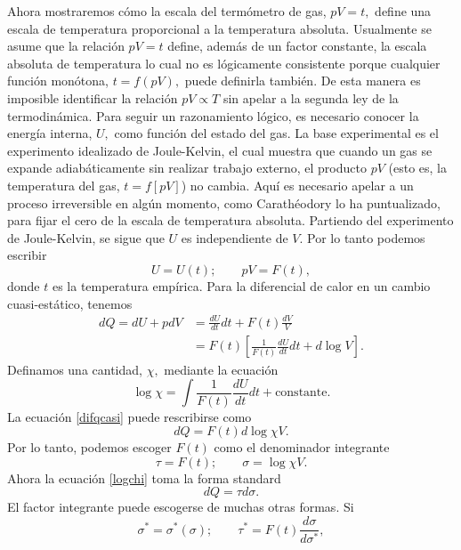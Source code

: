 \documentclass{article}
\theoremstyle{definition} \newtheorem{defi}{Definici\'on}
\theoremstyle{definition} \newtheorem{teo}{Teorema}
\theoremstyle{definition} \newtheorem{cor}{Corolario}
\begin{document}
Ahora mostraremos c\'omo la escala del term\'ometro de gas, $pV=t,$ define una escala de temperatura proporcional a la temperatura absoluta. Usualmente se asume que la relaci\'on $pV=t$ define, adem\'as de un factor constante, la escala absoluta de temperatura lo cual no es l\'ogicamente consistente porque cualquier funci\'on mon\'otona, $t=f(pV),$ puede definirla tambi\'en. De esta manera es imposible identificar la relaci\'on $pV\propto T$ sin apelar a la segunda ley de la termodin\'amica. Para seguir un razonamiento l\'ogico, es necesario conocer la energ\'ia interna, $U,$ como funci\'on del estado del gas. La base experimental es el experimento idealizado de Joule-Kelvin, el cual muestra que cuando un gas se expande adiab\'aticamente sin realizar trabajo externo, el producto $pV$ (esto es, la temperatura del gas, $t=f[pV]$) no cambia. Aqu\'i es necesario apelar a un proceso irreversible en alg\'un momento, como Carath\'eodory lo ha puntualizado, para fijar el cero de la escala de temperatura absoluta. Partiendo del experimento de Joule-Kelvin, se sigue que $U$ es independiente de $V.$ Por lo tanto podemos escribir
\begin{equation}
U=U(t);\qquad pV=F(t),
\end{equation}
donde $t$ es la temperatura emp\'irica. Para la diferencial de calor en un cambio cuasi-est\'atico, tenemos
\begin{align}\label{difqcasi}
dQ=dU+pdV&=\frac{dU}{dt}dt+F(t)\frac{dV}{V}\nonumber\\
&=F(t)\left[\frac{1}{F(t)}\frac{dU}{dt}dt+d\log V\right].
\end{align}
Definamos una cantidad, $\chi,$ mediante la ecuaci\'on
\begin{equation}
\log \chi =\int \frac{1}{F(t)}\frac{dU}{dt}dt+\text{constante}.
\end{equation}
La ecuaci\'on \eqref{difqcasi} puede rescribirse como
\begin{equation}\label{logchi}
dQ=F(t)d\log \chi V.
\end{equation}
Por lo tanto, podemos escoger $F(t)$ como el denominador integrante
\begin{equation}
\tau=F(t);\qquad \sigma =\log \chi V.
\end{equation}
Ahora la ecuaci\'on \eqref{logchi} toma la forma standard
\begin{equation}\label{facin2}
dQ=\tau d\sigma.
\end{equation}
El factor integrante puede escogerse de muchas otras formas. Si
\begin{equation}\label{star}
\sigma^*=\sigma^*(\sigma);\qquad \tau^*=F(t)\frac{d\sigma}{d\sigma^*},
\end{equation}
\end{document}
